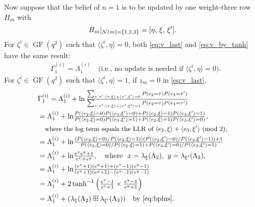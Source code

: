\documentclass{ieeeaccess}
\DeclareMathOperator{\GF}{GF}
\newcommand{\sN}{{\cal N}}
\theoremstyle{definition}		%
\begin{document}
Now suppose that the belief of $n=1$ is to be updated by one weight-three row $H_m$ with
\begin{equation*} %
H_m|_{\sN(m)=\{1,2,3\}}=[\eta,\, \xi,\, \xi'].
\end{equation*}
%
For $\zeta^i\in \GF(q^2)$ such that $\langle \zeta^i, \eta \rangle = 0$, both \eqref{eq:v_last} and \eqref{eq:v_by_tanh} have the same result:
	\begin{align*}
	~~~~\Gamma_1^{(i)} = \Lambda_1^{(i)} \quad \text{(i.e., no update is needed if $\langle \zeta^i, \eta \rangle = 0$).} %
	\end{align*}
%
%
For $\zeta^i\in \GF(q^2)$ such that $\langle \zeta^i, \eta \rangle = 1$, if $z_m=0$ in \eqref{eq:v_last},
	\begin{align*} \label{eq:comb}
	&\Gamma_1^{(i)} 
	= \Lambda_1^{(i)}+ \ln\tfrac{ \sum_{\tau,\tau':\langle \tau, \xi \rangle + \langle \tau', \xi' \rangle = 0} P(e_2 = \tau)P(e_3 = \tau') }
								{ \sum_{\tau,\tau':\langle \tau, \xi \rangle + \langle \tau', \xi' \rangle = 1} P(e_2 = \tau)P(e_3 = \tau') }\notag\\
	&= \Lambda_1^{(i)}+ {\ln}\tfrac{ P(\langle e_2,\xi \rangle=0) P(\langle e_3,\xi' \rangle=0) + P(\langle e_2,\xi \rangle=1) P(\langle e_3,\xi' \rangle=1) }
	{ P(\langle e_2,\xi  \rangle=0) P(\langle e_3,\xi' \rangle=1) + P(\langle e_2,\xi \rangle=1) P(\langle e_3,\xi' \rangle=0) },\notag\\
	&\quad \text{\small where the log term equals the LLR of $\langle e_2,\xi \rangle + \langle e_3,\xi' \rangle$ (mod 2),}\notag\\
	&= \Lambda_1^{(i)}+ {\ln}\tfrac{(P(\langle e_2,\xi \rangle=0)/P(\langle e_2,\xi \rangle=1))(P(\langle e_3,\xi' \rangle=0)/P(\langle e_3,\xi' \rangle=1)) + 1 }
	{ P(\langle e_2,\xi  \rangle=0)/P(\langle e_2,\xi \rangle=1) +  P(\langle e_3,\xi' \rangle=0)/P(\langle e_3,\xi' \rangle=1) }\notag\\
	&= \Lambda_1^{(i)} + {\ln}\tfrac{ e^x e^y + 1 }{ e^x + e^y }, \quad \text{where} ~~  x=\lambda_{\xi}(\Lambda_2),\ y=\lambda_{\xi'}(\Lambda_3),\notag\\
	&= \Lambda_1^{(i)} + {\ln}\tfrac{ (e^x+1)(e^y+1) + (e^x-1)(e^y-1) }{ (e^x+1)(e^y+1) - (e^x-1)(e^y-1) }\notag\\
	&= \Lambda_1^{(i)} + 2\tanh^{-1}\left(\tfrac{e^x-1}{e^x+1} \times \tfrac{e^y-1}{e^y+1}\right)\notag\\
	&= \Lambda_1^{(i)} + ( \lambda_{\xi}(\Lambda_2) \boxplus \lambda_{\xi'}(\Lambda_3) ) \quad \text{by   \eqref{eq:bplus}}.
	\end{align*}
\end{document}

